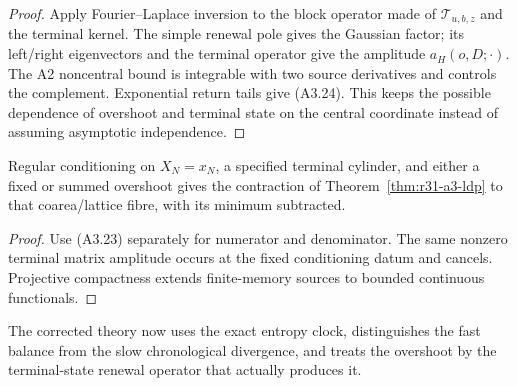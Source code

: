 \begin{proof}
Apply Fourier--Laplace inversion to the block operator made of
$\mathscr T_{u,b,z}$ and the terminal kernel.  The simple renewal pole gives
the Gaussian factor; its left/right eigenvectors and the terminal operator
give the amplitude $a_H(o,D;\cdot)$.  The A2 noncentral bound is integrable
with two source derivatives and controls the complement.  Exponential return
tails give (A3.24).  This keeps the possible dependence of overshoot and
terminal state on the central coordinate instead of assuming asymptotic
independence.
\end{proof}

\begin{corollary}
\label{cor:r31-a3-conditioned}
Regular conditioning on $X_N=x_N$, a specified terminal cylinder, and either
a fixed or summed overshoot gives the contraction of
Theorem~\ref{thm:r31-a3-ldp} to that coarea/lattice fibre, with its minimum
subtracted.
\end{corollary}

\begin{proof}
Use (A3.23) separately for numerator and denominator.  The same nonzero
terminal matrix amplitude occurs at the fixed conditioning datum and cancels.
Projective compactness extends finite-memory sources to bounded continuous
functionals.
\end{proof}

The corrected theory now uses the exact entropy clock, distinguishes the fast
balance from the slow chronological divergence, and treats the overshoot by
the terminal-state renewal operator that actually produces it.
